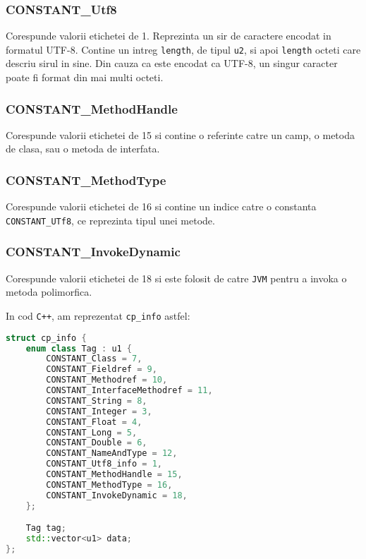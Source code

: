 \subsubsection{CONSTANT\_Utf8}

Corespunde valorii etichetei de 1. Reprezinta un sir de caractere
encodat in formatul UTF-8. Contine un intreg \texttt{length}, de tipul
\texttt{u2}, si apoi \texttt{length} octeti care descriu sirul in sine.
Din cauza ca este encodat ca UTF-8, un singur caracter poate fi format
din mai multi octeti.

\subsubsection{CONSTANT\_MethodHandle}

Corespunde valorii etichetei de 15 si contine o referinte catre un camp,
o metoda de clasa, sau o metoda de interfata.

\subsubsection{CONSTANT\_MethodType}

Corespunde valorii etichetei de 16 si contine un indice catre o
constanta \texttt{CONSTANT\_UTf8}, ce reprezinta tipul unei metode.

\subsubsection{CONSTANT\_InvokeDynamic}

Corespunde valorii etichetei de 18 si este folosit de catre \texttt{JVM}
pentru a invoka o metoda polimorfica.

In cod \texttt{C++}, am reprezentat \texttt{cp\_info} astfel:

\begin{lstlisting}[language=C++]
struct cp_info {
    enum class Tag : u1 {
        CONSTANT_Class = 7,
        CONSTANT_Fieldref = 9,
        CONSTANT_Methodref = 10,
        CONSTANT_InterfaceMethodref = 11,
        CONSTANT_String = 8,
        CONSTANT_Integer = 3,
        CONSTANT_Float = 4,
        CONSTANT_Long = 5,
        CONSTANT_Double = 6,
        CONSTANT_NameAndType = 12,
        CONSTANT_Utf8_info = 1,
        CONSTANT_MethodHandle = 15,
        CONSTANT_MethodType = 16,
        CONSTANT_InvokeDynamic = 18,
    };

    Tag tag;
    std::vector<u1> data;
};
\end{lstlisting}


